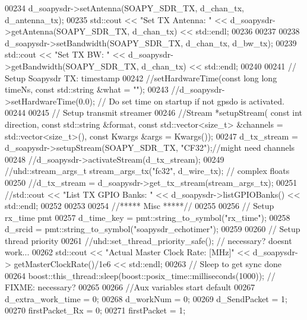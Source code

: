 \begin{DoxyCode}
00234       d_soapysdr->setAntenna(SOAPY_SDR_TX, d_chan_tx, d_antenna_tx);
00235       std::cout << \textcolor{stringliteral}{"Set TX Antenna: "}  << d_soapysdr->getAntenna(SOAPY_SDR_TX, 
      d_chan_tx) << std::endl;
00236 
00237 
00238       d_soapysdr->setBandwidth(SOAPY_SDR_TX, d_chan_tx, d_bw_tx);
00239       std::cout << \textcolor{stringliteral}{"Set TX BW: "}  << d_soapysdr->getBandwidth(SOAPY_SDR_TX, 
      d_chan_tx) << std::endl;
00240 
00241       \textcolor{comment}{// Setup Soapysdr TX: timestamp}
00242       \textcolor{comment}{//setHardwareTime(const long long timeNs, const std::string &what = "");}
00243       \textcolor{comment}{//d\_soapysdr->setHardwareTime(0.0); // Do set time on startup if not gpsdo is activated.}
00244 
00245       \textcolor{comment}{// Setup transmit streamer}
00246       \textcolor{comment}{//Stream *setupStream( const int direction, const std::string &format, const std::vector<size\_t>
       &channels = std::vector<size\_t>(), const Kwargs &args = Kwargs());}
00247       d_tx_stream = d_soapysdr->setupStream(SOAPY_SDR_TX, \textcolor{stringliteral}{"CF32"});\textcolor{comment}{//might need channels}
00248       \textcolor{comment}{//d\_soapysdr->activateStream(d\_tx\_stream);}
00249       \textcolor{comment}{//uhd::stream\_args\_t stream\_args\_tx("fc32", d\_wire\_tx); // complex floats}
00250       \textcolor{comment}{//d\_tx\_stream = d\_soapysdr->get\_tx\_stream(stream\_args\_tx);}
00251       \textcolor{comment}{//std::cout << "List TX GPIO Banks: " << d\_soapysdr->listGPIOBanks() << std::endl;}
00252 
00253 
00254       \textcolor{comment}{//***** Misc *****//}
00255 
00256       \textcolor{comment}{// Setup rx\_time pmt}
00257       d_time_key = pmt::string\_to\_symbol(\textcolor{stringliteral}{"rx\_time"});
00258       d_srcid = pmt::string\_to\_symbol(\textcolor{stringliteral}{"soapysdr\_echotimer"});
00259 
00260       \textcolor{comment}{// Setup thread priority}
00261       \textcolor{comment}{//uhd::set\_thread\_priority\_safe(); // necessary? doesnt work...}
00262       std::cout << \textcolor{stringliteral}{"Actual Master Clock Rate: [MHz]"} << d_soapysdr->
      getMasterClockRate()/1e6 << std::endl;
00263       \textcolor{comment}{// Sleep to get sync done}
00264       boost::this_thread::sleep(boost::posix\_time::milliseconds(1000)); \textcolor{comment}{// FIXME: necessary?}
00265 
00266       \textcolor{comment}{//Aux variables start default}
00267       d_extra_work_time = 0;
00268       d_workNum = 0;
00269       d_SendPacket = 1;
00270       firstPacket_Rx = 0;
00271       firstPacket = 1;

\end{DoxyCode}
